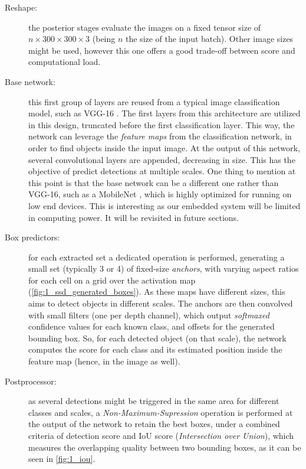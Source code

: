 \begin{description}
	
	\item[Reshape:] the posterior stages evaluate the images on a fixed tensor size of $n \times 300 \times 300 \times 3$ (being $n$ the size of the input batch). Other image sizes might be used, however this one offers a good trade-off between score and computational load.
	
	\item [Base network:] this first group of layers are reused from a typical image classification model, such as VGG-16 \cite{vgg16}. The first layers from this architecture are utilized in this design, truncated before the first classification layer. This way, the network can leverage the \textit{feature maps} from the classification network, in order to find objects inside the input image. At the output of this network, several convolutional layers are appended, decreasing in size. This has the objective of predict detections at multiple scales. One thing to mention at this point is that the base network can be a different one rather than VGG-16, such as a MobileNet \cite{mobilenet}, which is highly optimized for running on low end devices. This is interesting as our embedded system will be limited in computing power. It will be revisited in future sections.
	
	\item[Box predictors:] for each extracted set a dedicated operation is performed, generating a small set (typically 3 or 4) of fixed-size \textit{anchors}, with varying aspect ratios for each cell on a grid over the activation map (\autoref{fig:1_ssd_generated_boxes}). As these maps have different sizes, this aims to detect  objects in different scales. The anchors are then convolved with small filters (one per depth channel), which output \emph{softmaxed} confidence values for each known class, and offsets for the generated bounding box. So, for each detected object (on that scale), the network computes the score for each class and its estimated position inside the feature map (hence, in the image as well).
	
	\item [Postprocessor:] as several detections might be triggered in the same area for different classes and scales, a \textit{Non-Maximum-Supression} \cite{nms} operation is performed at the output of the network to retain the best boxes, under a combined criteria of detection score and IoU score (\textit{Intersection over Union}), which measures the overlapping quality between two bounding boxes, as it can be seen in \autoref{fig:1_iou}.
\end{description}

